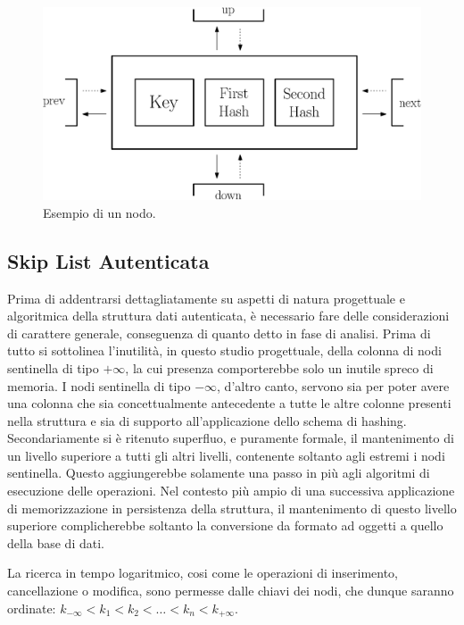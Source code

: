 	\begin{figure}
		\centering
		\includegraphics[scale=0.6]{figure/nodo.eps}
		\caption{Esempio di un nodo.}\label{fig:1}
	\end{figure}
		
	\subsection{Skip List Autenticata}
	
	
	Prima di addentrarsi dettagliatamente su aspetti di natura progettuale e algoritmica della struttura dati autenticata, è necessario fare delle considerazioni di carattere generale, conseguenza di quanto detto in fase di analisi.
	Prima di tutto si sottolinea l'inutilità, in questo studio progettuale, della colonna di nodi sentinella di tipo $ +\infty $, la cui presenza comporterebbe solo un inutile spreco di memoria. I nodi sentinella di tipo $ -\infty $, d'altro canto, servono sia per poter avere una colonna che sia concettualmente antecedente a tutte le altre colonne presenti nella struttura e sia di supporto all'applicazione dello schema di hashing.
	Secondariamente si è ritenuto superfluo, e puramente formale, il mantenimento di un livello superiore a tutti gli altri livelli, contenente soltanto agli estremi i nodi sentinella. Questo aggiungerebbe solamente una passo in più agli algoritmi di esecuzione delle operazioni. Nel contesto più ampio di una successiva applicazione di memorizzazione in persistenza della struttura, il mantenimento di questo livello superiore complicherebbe soltanto la conversione da formato ad oggetti a quello della base di dati.
	
	La ricerca in tempo logaritmico, cosi come le operazioni di inserimento, cancellazione o modifica, sono permesse dalle chiavi dei nodi, che dunque saranno ordinate: $ k_{-\infty} < k_{1} < k_{2} < \dots < k_{n} < k_{+\infty} $.
	

